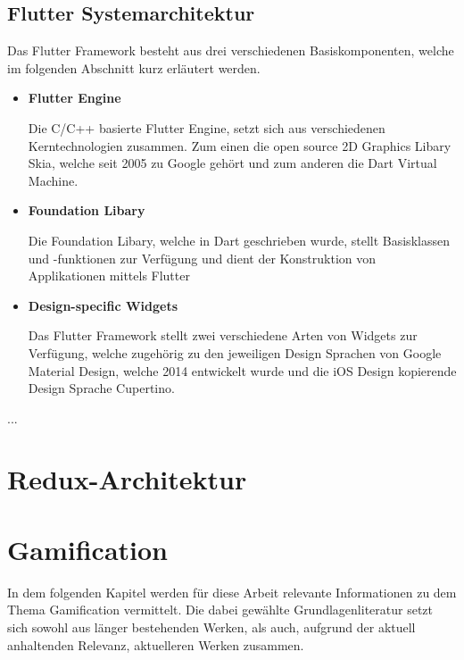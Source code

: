 \documentclass[bibliography=totoc,listof=totoc,BCOR=5mm,DIV=12,oneside]{scrbook}
\begin{document}
\subsection{Flutter Systemarchitektur} 
Das Flutter Framework besteht aus drei verschiedenen Basiskomponenten, welche im folgenden Abschnitt kurz erläutert werden.
\begin{itemize}
\item{\textbf{Flutter Engine}}

Die C/C++ basierte Flutter Engine, setzt sich aus verschiedenen Kerntechnologien zusammen. Zum einen die open source 2D Graphics Libary Skia\citep{Skia1}, welche seit 2005 zu Google gehört und zum anderen die Dart Virtual Machine.
\item{\textbf{Foundation Libary}}

Die Foundation Libary, welche in Dart geschrieben wurde, stellt Basisklassen und -funktionen zur Verfügung und dient der Konstruktion von Applikationen mittels Flutter
\item{\textbf{Design-specific Widgets}}

Das Flutter Framework stellt zwei verschiedene Arten von Widgets zur Verfügung, welche zugehörig zu den jeweiligen Design Sprachen von Google Material Design\citep{Mat1}, welche 2014 entwickelt wurde und die iOS Design kopierende Design Sprache Cupertino\citep{Cup1}.
\end{itemize}

		...
\section{Redux-Architektur}
\newpage
\section{Gamification} \label{sec:grundlagenkapitelGamification}
\par In dem folgenden Kapitel werden für diese Arbeit relevante Informationen zu dem Thema Gamification vermittelt. Die dabei gewählte Grundlagenliteratur setzt sich sowohl aus länger bestehenden Werken, als auch, aufgrund der aktuell anhaltenden Relevanz, aktuelleren Werken zusammen.
\end{document}
